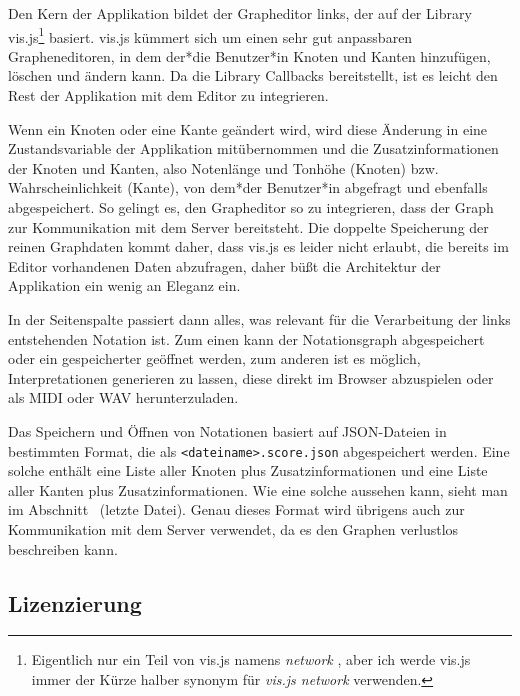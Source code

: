 \documentclass[a4paper,twocolumn]{article}
\begin{document}
Den Kern der Applikation bildet der Grapheditor links, der auf der Library
vis.js\footnote{Eigentlich nur ein Teil von vis.js namens {\it network}
\cite{visjs_network}, aber
ich werde vis.js immer der Kürze halber synonym für {\it vis.js network} verwenden.}
\cite{visjs} basiert. vis.js kümmert sich um einen sehr gut anpassbaren
Grapheneditoren, in dem der*die Benutzer*in Knoten und Kanten hinzufügen, löschen und
ändern kann. Da die Library Callbacks \cite{wikipedia_callback} bereitstellt,
ist es leicht den Rest der Applikation mit dem Editor zu integrieren.

Wenn ein Knoten oder eine Kante geändert wird, wird diese Änderung in eine
Zustandsvariable
der Applikation mitübernommen und die Zusatzinformationen der Knoten und
Kanten, also Notenlänge und Tonhöhe (Knoten) bzw. Wahrscheinlichkeit (Kante),
von dem*der Benutzer*in abgefragt und ebenfalls abgespeichert. So gelingt es, den
Grapheditor so zu integrieren, dass der Graph zur Kommunikation mit dem Server
bereitsteht. Die doppelte Speicherung der reinen Graphdaten kommt daher, dass
vis.js es leider nicht erlaubt, die bereits im Editor vorhandenen Daten
abzufragen, daher büßt die Architektur der Applikation ein wenig an Eleganz ein.

In der Seitenspalte passiert dann alles, was relevant für die Verarbeitung der
links entstehenden Notation ist. Zum einen kann der Notationsgraph abgespeichert
oder ein gespeicherter geöffnet werden, zum anderen ist es möglich,
Interpretationen generieren zu lassen, diese direkt im Browser abzuspielen oder
als MIDI oder WAV herunterzuladen.

Das Speichern und Öffnen von Notationen basiert auf JSON-Dateien
\cite{json} in bestimmten Format, die als
\lstinline[basicstyle=\ttfamily]|<dateiname>.score.json| abgespeichert werden.
Eine solche enthält eine Liste aller Knoten plus Zusatzinformationen und eine
Liste aller Kanten plus Zusatzinformationen. Wie eine solche aussehen kann,
sieht man im Abschnitt~ (letzte Datei). Genau dieses Format
wird übrigens auch zur Kommunikation mit dem Server verwendet, da es den Graphen
verlustlos beschreiben kann.

\subsection*{Lizenzierung}
\end{document}
